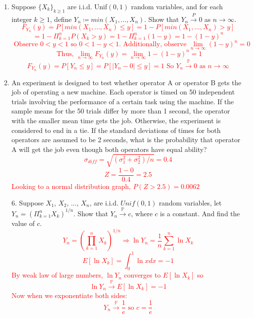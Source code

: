 \documentclass{article}
\newcommand{\defeq}{\coloneqq}
\begin{document}
\begin{enumerate}
    \item Suppose $\{X_k\}_{k\geq1}$ are i.i.d. \!\!\!Unif$(0, 1)$ random variables, and for each integer $k \geq 1$, define $Y_n \defeq min(X_1, ..., X_n)$. Show that $Y_n \xrightarrow{P} 0$ as $n \rightarrow \infty$.
    \textcolor{red}{
    \[F_{Y_n}(y) = P[min(X_1, ..., X_n) \leq y ] = 1 - P[min(X_1, ..., X_n) > y ]\] 
    \[= 1 - \Pi_{k=1}^nP(X_k > y) = 1 - \Pi_{k=1}^n(1-y) = 1-(1-y)^n\]
    \[
        \text{ Observe } 0 < y < 1 \text{ so } 0 < 1-y < 1\text{.  Additionally, observe } \lim_{n\to\infty} (1-y)^n = 0
    \]
    \[
        \text { Thus, } \lim_{n\to\infty} F_{Y_n}(y) = \lim_{n\to\infty} 1-(1-y)^n = 1
    \]
    \[
        F_{Y_n}(y)= P[Y_n \leq y ] = P[|Y_n-0| \leq y ] = 1 \text{ So } Y_n \xrightarrow{\mathbb{P}} 0\text{ as }n \rightarrow \infty
    \]
    }
\pagebreak
    \item An experiment is designed to test whether operator A or operator B gets the job of operating a new machine. Each operator is timed on 50 independent trials involving the performance of a certain task using the machine. If the sample means for the 50 trials differ by more than 1 second, the operator with the smaller mean time gets the job. Otherwise, the experiment is considered to end in a tie. If the standard deviations of times for both operators are assumed to be 2 seconds, what is the probability that operator A will get the job even though both operators have equal ability?
    \textcolor{red}{
    \[
        \sigma_{diff} = \sqrt{(\sigma_1^2+\sigma_2^2)/n} = 0.4
    \]
    \[
        Z = \frac{1-0}{0.4} = 2.5
    \]
    Looking to a normal distribution graph, $P(Z>2.5) = 0.0062$
    }
    \item [6. ] Suppose $X_1$, $X_2$, ..., $X_n$, are i.i.d. $Unif(0, 1)$ random variables, let $Y_n = (\Pi^n_{k=1} X_k)^{1/n}$. Show that $Y_n \xrightarrow{\mathbb{P}} c$, where $c$ is a constant. And find the value of $c$.
    \textcolor{red}{
    \[
        Y_n = (\prod^n_{k=1} X_k)^{1/n} \Rightarrow \ln Y_n = \frac{1}{n} \sum_{k=1}^n \ln X_k
    \]
    \[
        E[\ln X_k]  = \int_0^1 \ln xdx = -1 
    \]
    By weak law of large numbers, $\ln Y_n$ converges to $E[\ln X_k]$ so 
    \[
        \ln Y_n \xrightarrow{\mathbb{P}} E[\ln X_k] = -1
    \]
    Now when we exponentiate both sides:
    \[
        Y_n \xrightarrow{\mathbb{P}}  \frac{1}{e} \text{ so } c = \frac{1}{e}
    \]
    }

\end{enumerate}
\end{document}
